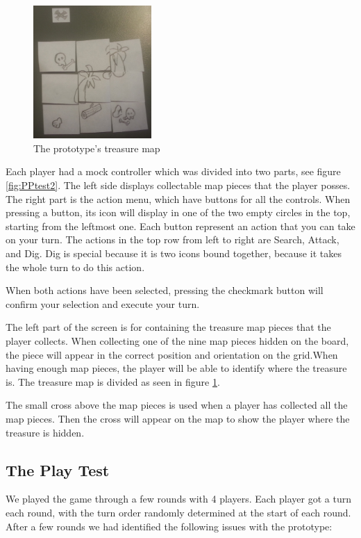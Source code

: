 \begin{figure}
\begin{center}
\includegraphics[width=0.4\textwidth]{figures/PPtestMap} 
\end{center}
\caption{The prototype's treasure map}\label{fig:PPtest3}
\end{figure}

Each player had a mock controller which was divided into two parts, see figure \ref{fig:PPtest2}. The left side displays collectable map pieces that the player posses. The right part is the action menu, which have buttons for all the controls. When pressing a button, its icon will display in one of the two empty circles in the top, starting from the leftmost one. Each button represent an action that you can take on your turn. The actions in the top row from left to right are Search, Attack, and Dig. Dig is special because it is two icons bound together, because it takes the whole turn to do this action.

When both actions have been selected, pressing the checkmark button will confirm your selection and execute your turn.

The left part of the screen is for containing the treasure map pieces that the player collects. When collecting one of the nine map pieces hidden on the board, the piece will appear in the correct position and orientation on the grid.When having enough map pieces, the player will be able to identify where the treasure is. The treasure map is divided as seen in figure \ref{fig:PPtest3}.

The small cross above the map pieces is used when a player has collected all the map pieces. Then the cross will appear on the map to show the player where the treasure is hidden.

\subsection{The Play Test}
We played the game through a few rounds with 4 players. Each player got a turn each round, with the turn order randomly determined at the start of each round.  After a few rounds we had identified the following issues with the prototype:

